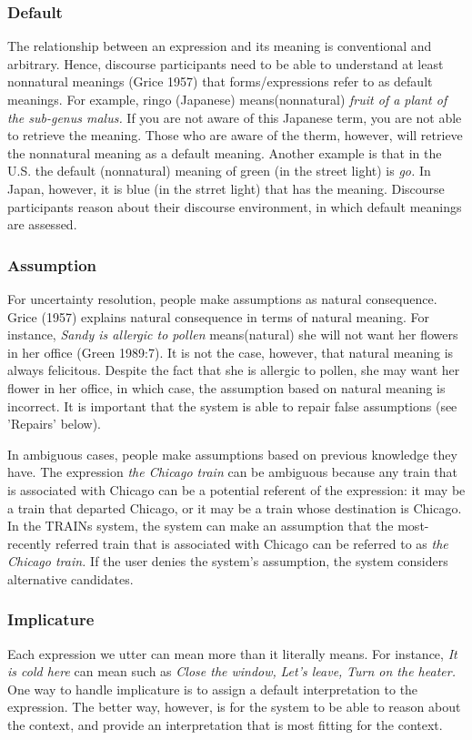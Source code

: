 \documentclass{article}
\begin{document}
\subsubsection{Default}
The relationship between an expression and its meaning is
conventional and arbitrary.  Hence, discourse participants need to be able to understand at least nonnatural meanings (Grice 1957) that forms/expressions refer to as default meanings.  For example, ringo (Japanese)
means(nonnatural) {\em fruit of a plant of the sub-genus malus.}  If you are not aware of this Japanese term, you are not able to retrieve the meaning.  Those who are aware of the therm, however, will retrieve the nonnatural meaning as a default meaning.  Another example is that in the U.S. the default (nonnatural) meaning of green (in the street light) is {\em go.}  In Japan, however, it is blue (in the strret light) that has the meaning.  Discourse participants reason about their discourse environment, in which default meanings are assessed.


\subsubsection{Assumption}
For uncertainty resolution, people make assumptions as natural
consequence.  Grice (1957) explains natural consequence in terms of
natural meaning.  For instance, {\em Sandy is allergic to pollen}
means(natural) she will not want her flowers in her office (Green
1989:7).  It is not the case, however, that natural meaning is always felicitous.  Despite the fact that she is allergic to pollen, she may want her flower in her office, in which case, the assumption based on natural meaning is incorrect.  It is important that the system is able to repair false assumptions (see 'Repairs' below).

In ambiguous cases, people make assumptions based on previous knowledge they
have.  The expression {\em the Chicago train} can be ambiguous because
any train that is associated with Chicago can be a potential referent
of the expression: it may be a train that departed Chicago, or it may
be a train whose destination is Chicago.  In the TRAINs system, the
system can make an assumption that the most-recently referred train
that is associated with Chicago can be referred to as {\em the Chicago train.}  If the user denies the system's assumption, the system considers alternative candidates.


\subsubsection{Implicature}
Each expression we utter can mean more than it literally means.  For
instance, {\em It is cold here} can mean such as  {\em Close the
window,} {\em Let's leave,} {\em Turn on the heater.}  One way to handle implicature is to assign a default interpretation to the expression.  The better way, however, is for the system to be able to reason about the context, and provide an interpretation that is most fitting for the context.
\end{document}
